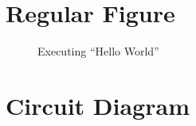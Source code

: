 \section{Regular Figure}
\begin{figure}[H]
  \centering
  \caption{Executing ``Hello World''}
  \label{fig:intro-01}
\end{figure}

\section{Circuit Diagram}
